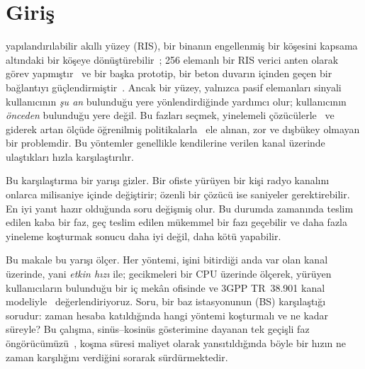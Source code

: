 \section{Giriş}
\label{sec:intro}

 yapılandırılabilir akıllı yüzey (RIS), bir binanın engellenmiş bir köşesini kapsama altındaki bir köşeye dönüştürebilir~\cite{Basar2019Access,DiRenzo2020JSAC,Wu2021TCOM}; 256 elemanlı bir RIS verici anten olarak görev yapmıştır~\cite{Dai2020Access} ve bir başka prototip, bir beton duvarın içinden geçen bir bağlantıyı güçlendirmiştir~\cite{Pei2021TCOM}. Ancak bir yüzey, yalnızca pasif elemanları sinyali kullanıcının \emph{şu an} bulunduğu yere yönlendirdiğinde yardımcı olur; kullanıcının \emph{önceden} bulunduğu yere değil. Bu fazları seçmek, yinelemeli çözücülerle~\cite{Wu2019TWC,Abeywickrama2020TCOM,Pan2020TWC,Guo2020TWC,Choi2024TCOM} ve giderek artan ölçüde öğrenilmiş politikalarla~\cite{Huang2020JSAC} ele alınan, zor ve dışbükey olmayan bir problemdir. Bu yöntemler genellikle kendilerine verilen kanal üzerinde ulaştıkları hızla karşılaştırılır.

Bu karşılaştırma bir yarışı gizler. Bir ofiste yürüyen bir kişi radyo kanalını onlarca milisaniye içinde değiştirir; özenli bir çözücü ise saniyeler gerektirebilir. En iyi yanıt hazır olduğunda soru değişmiş olur. Bu durumda zamanında teslim edilen kaba bir faz, geç teslim edilen mükemmel bir fazı geçebilir ve daha fazla yineleme koşturmak sonucu daha iyi değil, daha kötü yapabilir.

Bu makale bu yarışı ölçer. Her yöntemi, işini bitirdiği anda var olan kanal üzerinde, yani \emph{etkin hızı} ile; gecikmeleri bir CPU üzerinde ölçerek, yürüyen kullanıcıların bulunduğu bir iç mekân ofisinde ve 3GPP TR~38.901 kanal modeliyle~\cite{3gpp_channel} değerlendiriyoruz. Soru, bir baz istasyonunun (BS) karşılaştığı sorudur: zaman hesaba katıldığında hangi yöntemi koşturmalı ve ne kadar süreyle? Bu çalışma, sinüs--kosinüs gösterimine dayanan tek geçişli faz öngörücümüzü~\cite{SavasciSen2026AISY}, koşma süresi maliyet olarak yansıtıldığında böyle bir hızın ne zaman karşılığını verdiğini sorarak sürdürmektedir.

